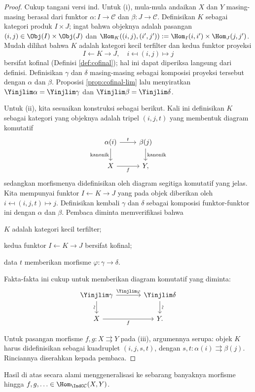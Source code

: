 \begin{proof}
	Cukup tangani versi ind. Untuk (i), mula-mula andaikan $X$ dan $Y$ masing-masing berasal dari funktor $\alpha:I\to\mathcal{C}$ dan $\beta:J\to\mathcal{C}$. Definisikan $K$ sebagai kategori produk $I\times J$; ingat bahwa objeknya adalah pasangan $(i,j)\in\Obj(I)\times\Obj(J)$ dan $\Hom_K((i,j),(i',j')):=\Hom_I(i,i')\times\Hom_J(j,j')$. Mudah dilihat bahwa $K$ adalah kategori kecil terfilter dan kedua funktor proyeksi
	\[ I \leftarrow K \rightarrow J, \quad i \mapsfrom (i, j) \mapsto j \]
bersifat kofinal (Definisi \ref{def:cofinal}); hal ini dapat diperiksa langsung dari definisi. Definisikan $\gamma$ dan $\delta$ masing-masing sebagai komposisi proyeksi tersebut dengan $\alpha$ dan $\beta$. Proposisi \ref{prop:cofinal-lim} lalu menyiratkan $\Yinjlim\alpha=\Yinjlim\gamma$ dan $\Yinjlim\beta=\Yinjlim\delta$.
	
	Untuk (ii), kita sesuaikan konstruksi sebagai berikut. Kali ini definisikan $K$ sebagai kategori yang objeknya adalah tripel $(i,j,t)$ yang membentuk diagram komutatif
	\[\begin{tikzcd}
		\alpha(i) \arrow[d, "\text{kanonik}"'] \arrow[r, "t"] & \beta(j) \arrow[d, "\text{kanonik}"] \\
		X \arrow[r, "f"'] & Y,
	\end{tikzcd}\]
sedangkan morfismenya didefinisikan oleh diagram segitiga komutatif yang jelas. Kita mempunyai funktor $I\leftarrow K\rightarrow J$ yang pada objek diberikan oleh $i\mapsfrom(i,j,t)\mapsto j$. Definisikan kembali $\gamma$ dan $\delta$ sebagai komposisi funktor-funktor ini dengan $\alpha$ dan $\beta$. Pembaca diminta memverifikasi bahwa
	\begin{compactitem}
		\item $K$ adalah kategori kecil terfilter;
		\item kedua funktor $I\leftarrow K\rightarrow J$ bersifat kofinal;
		\item data $t$ memberikan morfisme $\varphi:\gamma\to\delta$.
	\end{compactitem}
	
Fakta-fakta ini cukup untuk memberikan diagram komutatif yang diminta:
	\[\begin{tikzcd}[column sep=large]
		\Yinjlim \gamma \arrow[r, "{\Yinjlim \varphi}"] \arrow[d, "\sim"' sloped] & \Yinjlim \delta \arrow[d, "\sim" sloped] \\
		X \arrow[r, "f"'] & Y.
	\end{tikzcd}\]
	
	Untuk pasangan morfisme $f,g:X\rightrightarrows Y$ pada (iii), argumennya serupa: objek $K$ harus didefinisikan sebagai kuadruplet $(i,j,s,t)$, dengan $s,t:\alpha(i)\rightrightarrows\beta(j)$. Rinciannya diserahkan kepada pembaca.
\end{proof}

Hasil di atas secara alami menggeneralisasi ke sebarang banyaknya morfisme hingga $f,g,\ldots\in\Hom_{\IndC\mathcal{C}}(X,Y)$.

